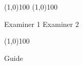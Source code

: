
\begin{center}
\line(1,0){100}   \hspace{3in}          \line(1,0){100}                            \end{center}  

\hspace{0.27in}Examiner 1     \hspace{3.6in}      Examiner 2    
\vspace*{1\baselineskip} 
\begin{center}
\line(1,0){100}
\end{center}
\vspace*{0\baselineskip} 
\begin{center}
Guide
\end{center}